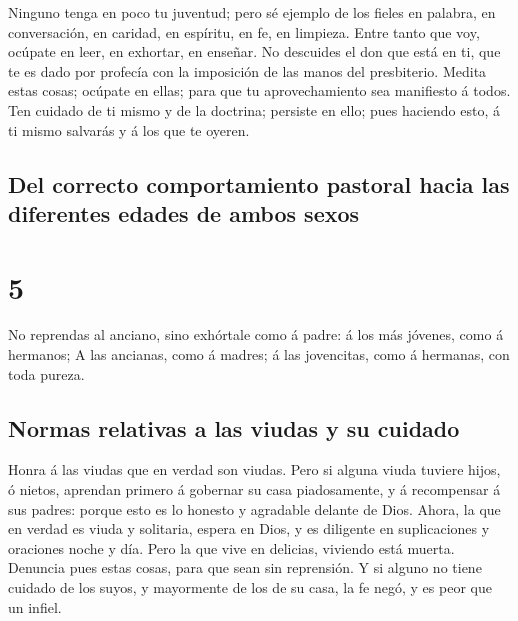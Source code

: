  Ninguno tenga en poco tu juventud; pero sé ejemplo de los
fieles en palabra, en conversación, en caridad, en espíritu, en fe, en
limpieza.  Entre tanto que voy, ocúpate en leer, en
exhortar, en enseñar.  No descuides el don que está en ti,
que te es dado por profecía con la imposición de las manos del
presbiterio.  Medita estas cosas; ocúpate en ellas; para
que tu aprovechamiento sea manifiesto á todos.  Ten cuidado
de ti mismo y de la doctrina; persiste en ello; pues haciendo esto, á ti
mismo salvarás y á los que te oyeren.

\hypertarget{del-correcto-comportamiento-pastoral-hacia-las-diferentes-edades-de-ambos-sexos}{%
\subsection{Del correcto comportamiento pastoral hacia las diferentes
edades de ambos
sexos}\label{del-correcto-comportamiento-pastoral-hacia-las-diferentes-edades-de-ambos-sexos}}

\hypertarget{section-4}{%
\section{5}\label{section-4}}

 No reprendas al anciano, sino exhórtale como á padre: á los
más jóvenes, como á hermanos;  A las ancianas, como á
madres; á las jovencitas, como á hermanas, con toda pureza.

\hypertarget{normas-relativas-a-las-viudas-y-su-cuidado}{%
\subsection{Normas relativas a las viudas y su
cuidado}\label{normas-relativas-a-las-viudas-y-su-cuidado}}

 Honra á las viudas que en verdad son viudas. 
Pero si alguna viuda tuviere hijos, ó nietos, aprendan primero á
gobernar su casa piadosamente, y á recompensar á sus padres: porque esto
es lo honesto y agradable delante de Dios.  Ahora, la que en
verdad es viuda y solitaria, espera en Dios, y es diligente en
suplicaciones y oraciones noche y día.  Pero la que vive en
delicias, viviendo está muerta.  Denuncia pues estas cosas,
para que sean sin reprensión.  Y si alguno no tiene cuidado
de los suyos, y mayormente de los de su casa, la fe negó, y es peor que
un infiel.

